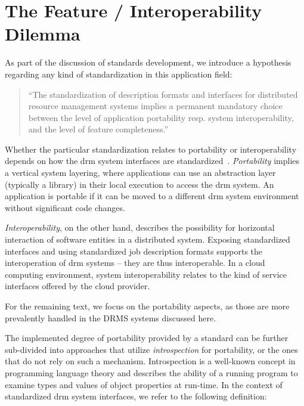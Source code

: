\documentclass[twocolumn]{svjour3}       %
\begin{document}
\section{The Feature / Interoperability Dilemma}
\label{sec:hypothesis}

As part of the discussion of standards development, we introduce a hypothesis regarding any kind of standardization in this application field:

\begin{quote}
``The standardization of description formats and interfaces for distributed resource management systems implies a permanent mandatory choice between the level of application portability resp. system interoperability, and the level of feature completeness.''
\end{quote}

Whether the particular standardization relates to portability or interoperability depends on how the \gls{drm} system interfaces are standardized~\cite{citemaster_9638}. \emph{Portability} implies a vertical system layering, where applications can use an abstraction layer (typically a library) in their local execution to access the \gls{drm} system. An application is portable if it can be moved to a different \gls{drm} system environment without significant code changes. 

\emph{Interoperability}, on the other hand, describes the possibility for horizontal interaction of software entities in a distributed system.  Exposing standardized interfaces and using standardized job description formats supports the interoperation of \gls{drm} systems -- they are thus interoperable.  In a cloud computing environment, system interoperability relates to the kind of service interfaces offered by the cloud provider.


For the remaining text, we focus on the portability aspects, as those are more prevalently handled in the DRMS systems discussed here.

The implemented degree of portability provided by a standard can be further sub-divided into approaches that utilize \emph{introspection} for portability, or the ones that do not rely on such a mechanism. Introspection is a well-known concept in programming language theory and describes the ability of a running program to examine types and values of object properties at run-time. In the context of standardized \gls{drm} system interfaces, we refer to the following definition:
\end{document}

